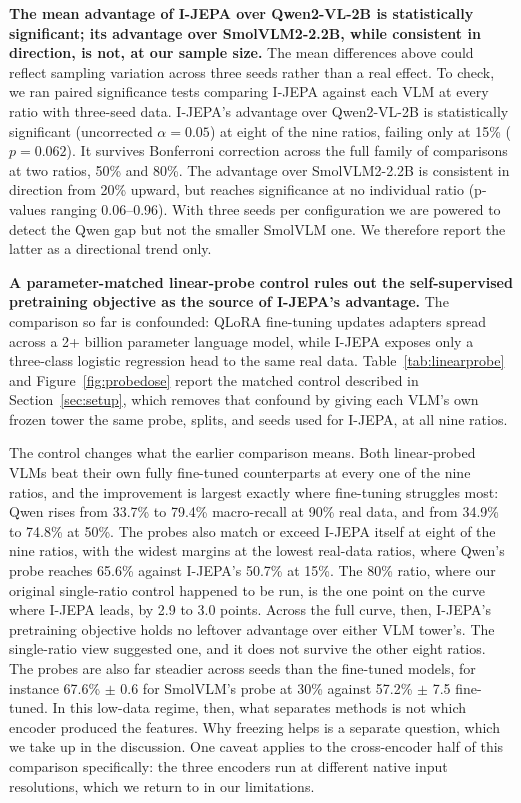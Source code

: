 \documentclass[conference]{IEEEtran}
\begin{document}
\textbf{The mean advantage of I-JEPA over Qwen2-VL-2B is statistically significant; its advantage over SmolVLM2-2.2B, while consistent in direction, is not, at our sample size.} The mean differences above could reflect sampling variation across three seeds rather than a real effect. To check, we ran paired significance tests comparing I-JEPA against each VLM at every ratio with three-seed data. I-JEPA's advantage over Qwen2-VL-2B is statistically significant (uncorrected $\alpha=0.05$) at eight of the nine ratios, failing only at 15\% ($p=0.062$). It survives Bonferroni correction across the full family of comparisons at two ratios, 50\% and 80\%. The advantage over SmolVLM2-2.2B is consistent in direction from 20\% upward, but reaches significance at no individual ratio (p-values ranging 0.06--0.96). With three seeds per configuration we are powered to detect the Qwen gap but not the smaller SmolVLM one. We therefore report the latter as a directional trend only.

\textbf{A parameter-matched linear-probe control rules out the self-supervised pretraining objective as the source of I-JEPA's advantage.} The comparison so far is confounded: QLoRA fine-tuning updates adapters spread across a 2+ billion parameter language model, while I-JEPA exposes only a three-class logistic regression head to the same real data. Table~\ref{tab:linearprobe} and Figure~\ref{fig:probedose} report the matched control described in Section~\ref{sec:setup}, which removes that confound by giving each VLM's own frozen tower the same probe, splits, and seeds used for I-JEPA, at all nine ratios.

The control changes what the earlier comparison means. Both linear-probed VLMs beat their own fully fine-tuned counterparts at every one of the nine ratios, and the improvement is largest exactly where fine-tuning struggles most: Qwen rises from 33.7\% to 79.4\% macro-recall at 90\% real data, and from 34.9\% to 74.8\% at 50\%. The probes also match or exceed I-JEPA itself at eight of the nine ratios, with the widest margins at the lowest real-data ratios, where Qwen's probe reaches 65.6\% against I-JEPA's 50.7\% at 15\%. The 80\% ratio, where our original single-ratio control happened to be run, is the one point on the curve where I-JEPA leads, by 2.9 to 3.0 points. Across the full curve, then, I-JEPA's pretraining objective holds no leftover advantage over either VLM tower's. The single-ratio view suggested one, and it does not survive the other eight ratios. The probes are also far steadier across seeds than the fine-tuned models, for instance 67.6\% $\pm$ 0.6 for SmolVLM's probe at 30\% against 57.2\% $\pm$ 7.5 fine-tuned. In this low-data regime, then, what separates methods is not which encoder produced the features. Why freezing helps is a separate question, which we take up in the discussion. One caveat applies to the cross-encoder half of this comparison specifically: the three encoders run at different native input resolutions, which we return to in our limitations.
\end{document}
